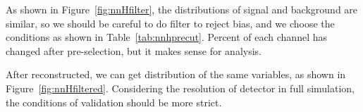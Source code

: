 \documentclass[11pt,a4paper]{cepcnote}
\begin{document}
As shown in Figure~\ref{fig:nnHfilter}, the distributions of signal and background are similar, so we should be careful to do filter 
to reject bias, and we choose the conditions as shown in Table~\ref{tab:nnhprecut}. 
Percent of each channel has changed after pre-selection, but it makes sense for analysis.

After reconstructed, we can get distribution of the same variables, as shown in Figure~\ref{fig:nnHfiltered}.
Considering the resolution of detector in full simulation, the conditions of validation should be more strict.

\end{document}
